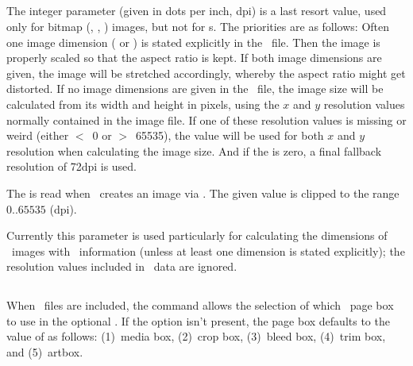 \documentclass{pdftexmanual}
\begin{document}
\subsection{}

The integer  parameter (given in dots per inch,
dpi) is a last resort value, used only for bitmap (\JPEG, \PNG,
\JBIGTWO) images, but not for \PDF{}s. The priorities are as follows:
Often one image dimension ( or ) is stated
explicitly in the \TEX\ file. Then the image is properly scaled so that
the aspect ratio is kept. If both image dimensions are given, the image
will be stretched accordingly, whereby the aspect ratio might get
distorted. If no image dimensions are given in the \TEX\ file, the image
size will be calculated from its width and height in pixels, using the
$x$ and $y$ resolution values normally contained in the image file. If
one of these resolution values is missing or weird (either $<$~0 or
$>$~65535), the  value will be used for both $x$
and $y$ resolution when calculating the image size. And if the
 is zero, a final fallback resolution of 72dpi is
used.

The  is read when \PDFTEX\ creates an image via
. The given value is clipped to the range $0..65535$
(dpi).

Currently this parameter is used particularly for calculating the
dimensions of \JPEG\ images with \EXIF\ information (unless at least one
dimension is stated explicitly); the resolution values included in
\EXIF\ data are ignored.

\subsection{}

When \PDF\ files are included, the command  allows the
selection of which \PDF\ page box to use in the optional
. If the option isn't present, the page box
defaults to the value of  as follows: (1)~media box,
(2)~crop box, (3)~bleed box, (4)~trim box, and (5)~artbox.

\subsection{}
\end{document}
